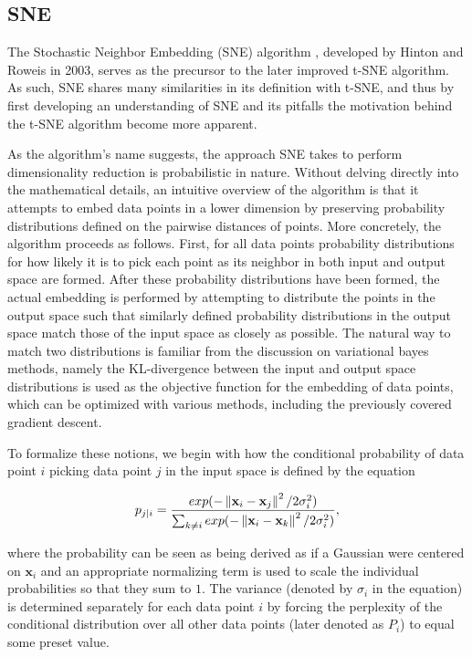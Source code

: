 \subsection{SNE}
\label{subsection:sne}

The Stochastic Neighbor Embedding (SNE) algorithm \cite{sne}, developed by Hinton and Roweis in 2003, serves as the precursor to the later improved t-SNE algorithm. As such, SNE shares many similarities in its definition with t-SNE, and thus by first developing an understanding of SNE and its pitfalls the motivation behind the t-SNE algorithm become more apparent.

As the algorithm's name suggests, the approach SNE takes to perform dimensionality reduction is probabilistic in nature. Without delving directly into the mathematical details, an intuitive overview of the algorithm is that it attempts to embed data points in a lower dimension by preserving probability distributions defined on the pairwise distances of points. More concretely, the algorithm proceeds as follows. First, for all data points probability distributions for how likely it is to pick each point as its neighbor in both input and output space are formed. After these probability distributions have been formed, the actual embedding is performed by attempting to distribute the points in the output space such that similarly defined probability distributions in the output space match those of the input space as closely as possible. The natural way to match two distributions is familiar from the discussion on variational bayes methods, namely the KL-divergence between the input and output space distributions is used as the objective function for the embedding of data points, which can be optimized with various methods, including the previously covered gradient descent.

To formalize these notions, we begin with how the conditional probability of data point $i$ picking data point $j$ in the input space is defined by the equation

\begin{equation}
p_{j \vert i} = \frac{exp(-\left\lVert\mathbf{x}_i - \mathbf{x}_j\right\rVert^2 / 2 \sigma_i^2)}{\sum_{k \neq i} exp(-\left\lVert\mathbf{x}_i - \mathbf{x}_k\right\rVert^2 / 2 \sigma_i^2)},
\label{eq:p_j_c_i}
\end{equation}

where the probability can be seen as being derived as if a Gaussian were centered on $\mathbf{x}_i$ and an appropriate normalizing term is used to scale the individual probabilities so that they sum to $1$. The variance (denoted by $\sigma_i$ in the equation) is determined separately for each data point $i$ by forcing the perplexity of the conditional distribution over all other data points (later denoted as $P_i$) to equal some preset value.

